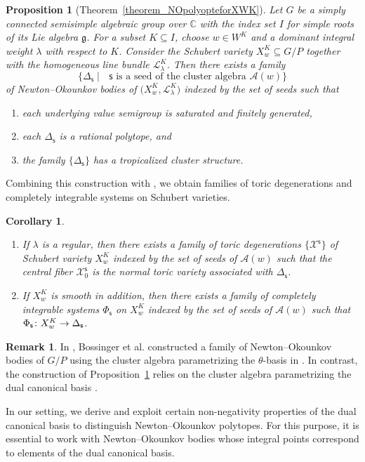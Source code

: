 \documentclass[11pt]{amsart}
\newcommand{\C}{\mathbb{C}}
\def\frak{\mathfrak}
\numberwithin{equation}{section}
\theoremstyle{plain}
\newtheorem{propx}[thmx]{Proposition}
\newtheorem{cor}[thmx]{Corollary}
\theoremstyle{definition}
\newtheorem{remark}[theorem]{Remark}
\def\to{\mathchoice{\longrightarrow}{\rightarrow}{\rightarrow}{\rightarrow}}
\numberwithin{equation}{section}
\newcommand{\seed}{\mathsf{s}}
\begin{document}
\begin{propx}[Theorem~\ref{theorem_NOpolyopteforXWK}]\label{propxA}
Let $G$ be a simply connected semisimple algebraic group over $\C$ with the index set $I$ for simple roots of its Lie algebra $\frak{g}$. For a subset $K \subseteq I$, choose $w \in W^K$ and a dominant integral weight $\lambda$ with respect to $K$. Consider the Schubert variety $X_w^K \subseteq G/P$ together with the homogeneous line bundle $\mathcal{L}^K_\lambda$. Then there exists a family 
$$
\bigl\{\Delta_\seed \mid \mbox{ $\seed$ is a seed of the cluster algebra $\mathcal{A}(w)$} \bigr\}
$$
of Newton--Okounkov bodies of $\bigl(X_w^K, \mathcal{L}^K_\lambda \bigr)$ indexed by the set of seeds such that
\begin{enumerate}
\item each underlying value semigroup is saturated and finitely generated,
\item each $\Delta_\seed$ is a rational polytope, and
\item the family $\{ \Delta_\seed \}$ has a tropicalized cluster structure.
\end{enumerate}
\end{propx}

Combining this construction with \cite{And13, HK15}, we obtain families of toric degenerations and completely integrable systems on Schubert varieties.

\begin{cor}\label{cor_B}
\begin{enumerate}
\item
If $\lambda$ is a regular, then there exists a family of toric degenerations $\{\mathcal{X}^\seed\}$ of Schubert variety $X_w^K$ indexed by the set of seeds of $\mathcal{A}(w)$ such that the central fiber $\mathcal{X}^\seed_0$ is the normal toric variety associated  with $\Delta_\seed$. 
\item
If $X_w^K$ is smooth in addition, then there exists a family of completely integrable systems $\Phi_\seed$ on $X_w^K$ indexed by the set of seeds of $\mathcal{A}(w)$ such that $\Phi_\seed \colon X_w^K \to \Delta_\seed$.
\end{enumerate}
\end{cor}

\begin{remark}
In \cite{BCMN24}, Bossinger et al. constructed a family of Newton--Okounkov bodies of $G/P$ using the cluster algebra parametrizing the $\theta$-basis in \cite{GHKK18}. In contrast, the construction of Proposition~\ref{propxA} relies on the cluster algebra parametrizing the dual canonical basis \cite{Lus90, Lus91, Kas90, Kas91, Kas93}.

In our setting, we derive and exploit certain non-negativity properties of the dual canonical basis to distinguish Newton--Okounkov polytopes. For this purpose, it is essential to work with Newton--Okounkov bodies whose integral points correspond to elements of the dual canonical basis.
\end{remark}
\end{document}
